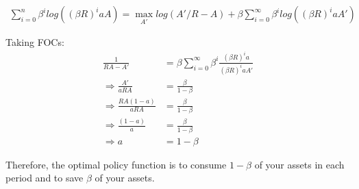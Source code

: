 \documentclass[11pt]{article} %
\DeclareMathOperator*{\argmax}{arg\,max}
\begin{document}
\begin{align*}
 \sum_{i=0}^n \beta^i log((\beta R)^iaA) = \max_{A'} log(A'/R- A) + \beta \sum_{i=0}^{\infty} \beta^i log((\beta R)^iaA')
\end{align*}

Taking FOCs:
\begin{align*}
\frac{1}{RA-A'} &= \beta\sum_{i=0}^{\infty} \beta^{i}\frac{(\beta R)^{i}a}{(\beta R)^{i}aA'}\\
\Rightarrow \frac{A'}{aRA} &= \frac{\beta}{1-\beta}\\
\Rightarrow \frac{RA(1-a)}{aRA} &= \frac{\beta}{1-\beta}\\
\Rightarrow \frac{(1-a)}{a} &= \frac{\beta}{1-\beta}\\
\Rightarrow a &= 1-\beta
\end{align*}

Therefore, the optimal policy function is to consume $1-\beta$ of your assets in each period and to save $\beta$ of your assets.


%
\end{document}
